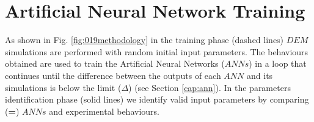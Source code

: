 
\chapter{Artificial Neural Network Training}
\label{cap:anntraining}

As shown in Fig. \ref{fig:019methodology} in the training phase (dashed lines)
$DEM$ simulations are performed
with random initial input parameters.
The behaviours obtained are used to train the
Artificial Neural Networks ($ANNs$) in a loop that continues until the
difference between the outputs of each $ANN$ and its simulations is below the
limit ($\Delta$) (see Section \ref{cap:ann}).
In the parameters identification phase (solid
lines) we identify valid input parameters by comparing (\textbf{=}) $ANNs$ and
experimental behaviours.



